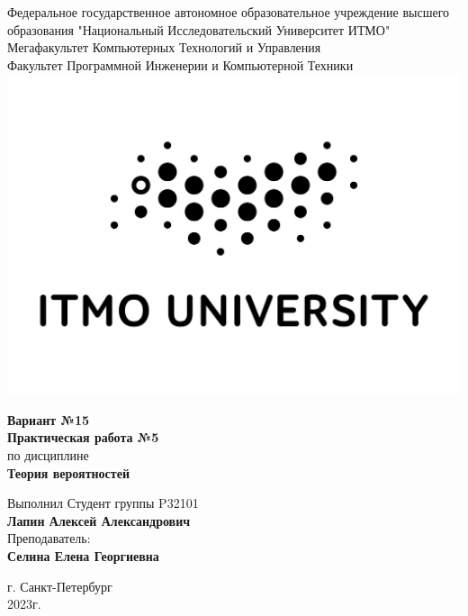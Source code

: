 \begin{center}
  Федеральное государственное автономное образовательное учреждение высшего образования "Национальный Исследовательский Университет ИТМО"\\ 
  Мегафакультет Компьютерных Технологий и Управления\\
  Факультет Программной Инженерии и Компьютерной Техники \\
  \includegraphics[scale=0.2]{itm.jpg} %
\end{center}
\vspace{1cm}

\begin{center}
  \large \textbf{Вариант №15}\\
  \textbf{Практическая работа №5}\\
  по дисциплине\\
  \textbf{Теория вероятностей}
\end{center}

\vspace{2cm}

\begin{flushright}
Выполнил Студент  группы P32101\\
\textbf{Лапин Алексей Александрович}\\
Преподаватель: \\
\textbf{Селина Елена Георгиевна}\\
\end{flushright}

\vspace{6cm}
\begin{center}
  г. Санкт-Петербург\\
  2023г.
\end{center}